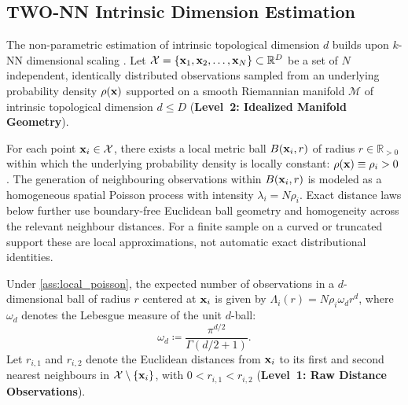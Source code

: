 \subsection{TWO-NN Intrinsic Dimension Estimation}
\label{subsec:two_nn_dimension}

The non-parametric estimation of intrinsic topological dimension $d$
builds upon $k$-NN dimensional scaling \parencite{levina2004,facco2017}.
Let $\mathcal{X} = \{\mathbf{x}_1, \mathbf{x}_2, \dots, \mathbf{x}_N\} \subset
\mathbb{R}^D$ be a set of $N$ independent, identically distributed
observations sampled from an underlying probability density
$\rho(\mathbf{x})$ supported on a smooth Riemannian manifold
$\mathcal{M}$ of intrinsic topological dimension $d \le D$
(\textbf{Level~2: Idealized Manifold Geometry}).

\begin{assumption}
  \label{ass:local_poisson}
  For each point $\mathbf{x}_i \in \mathcal{X}$, there exists a local
  metric ball $B(\mathbf{x}_i, r)$ of radius $r \in \mathbb{R}_{>0}$
  within which the underlying probability density is locally
  constant: $\rho(\mathbf{x}) \equiv \rho_i > 0$. The generation of
  neighbouring observations within $B(\mathbf{x}_i, r)$ is modeled as a
  homogeneous spatial Poisson process with intensity $\lambda_i = N \rho_i$.
  Exact distance laws below further use boundary-free Euclidean ball
  geometry and homogeneity across the relevant neighbour distances.
  For a finite sample on a curved or truncated support these are local
  approximations, not automatic exact distributional identities.
\end{assumption}

Under \cref{ass:local_poisson}, the expected number of
observations in a $d$-dimensional ball of radius $r$ centered at
$\mathbf{x}_i$ is given by $\Lambda_i(r) = N \rho_i \omega_d r^d$, where
$\omega_d$ denotes the Lebesgue measure of the unit $d$-ball:
\begin{equation}
  \omega_d \coloneqq \frac{\pi^{d/2}}{\Gamma(d/2 + 1)}.
  \label{eq:unit_ball_volume}
\end{equation}
Let $r_{i,1}$ and $r_{i,2}$ denote the Euclidean distances from
$\mathbf{x}_i$ to its first and second nearest neighbours in $\mathcal{X}
\setminus \{\mathbf{x}_i\}$, with $0 < r_{i,1} < r_{i,2}$
(\textbf{Level~1: Raw Distance Observations}).

